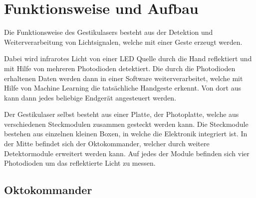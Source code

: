 \chapter{Funktionsweise und Aufbau}
\label{ch:Aufbau}
Die Funktionsweise des Gestikulasers besteht aus der Detektion und Weiterverarbeitung von Lichtsignalen, welche mit einer Geste erzeugt werden. 

Dabei wird infrarotes Licht von einer LED Quelle durch die Hand reflektiert und mit Hilfe von mehreren Photodioden detektiert. Die durch die Photodioden erhaltenen Daten werden dann in einer Software weiterverarbeitet, welche mit Hilfe von Machine Learning die tatsächliche Handgeste erkennt. Von dort aus kann dann jedes beliebige Endgerät angesteuert werden.

Der Gestikulaser selbst besteht aus einer Platte, der Photoplatte, welche aus verschiedenen Steckmodulen zusammen gesteckt werden kann. Die Steckmodule bestehen aus einzelnen kleinen Boxen, in welche die Elektronik integriert ist. In der Mitte befindet sich der Oktokommander, welcher durch weitere Detektormodule erweitert werden kann. Auf jedes der Module befinden sich vier Photodioden um das reflektierte Licht zu messen. 



\section{Oktokommander}
\label{sec:Oktokommander}

